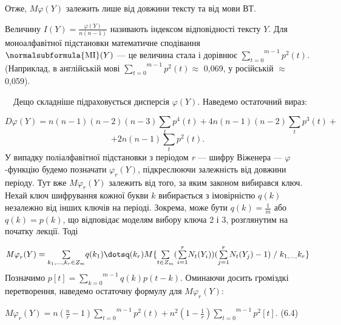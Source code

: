 Отже,  ${\mathit{M\varphi }(Y)}$ залежить лише від довжини тексту та від мови
ВТ.

 Величину  ${I(Y)=\frac{\varphi (Y)}{n(n-1)}}$ називають індексом відповідності
тексту  ${Y}$. Для моноалфавітної підстановки математичне сподівання  
${\normalsubformula{\text{MI}}(Y)}$ \textit{ }--- це величина стала і дорівнює 
${\overset{{m-1}}{\underset{{t=0}}{\sum }}{p^{{2}}(t)}}$. (Наприклад, в
англійській мові  ${\overset{{m-1}}{\underset{{t=0}}{\sum
}}{p^{{2}}(t)}}$${\approx}$ 0,069, у російській ${\approx}$ 0,059).

\ \ Дещо складніше підраховується дисперсія  ${\varphi (Y)}$. Наведемо
остаточний вираз:

\begin{equation*}
{\mathit{D\varphi }(Y)=n(n-1)(n-2)(n-3)\underset{{t}}{\sum
}{p^{{4}}(t)+4n(n-1)(n-2)\underset{{t}}{\sum }{p^{{3}}(t)+}}}
\end{equation*}
\begin{equation*}
{+2n(n-1)\underset{{t}}{\sum }{p^{{2}}(t)}\text{.}}
\end{equation*}
У випадку поліалфавітної підстановки з періодом \textit{r}\textit{ }--- шифру
Віженера ---  ${\varphi }${}-функцію будемо позначати  ${\varphi _{{r}}(Y)}$,
підкреслюючи залежність від довжини періоду. Тут вже  ${\mathit{M\varphi
}_{{r}}(Y)}$ залежить від того, за яким законом вибирався ключ. Нехай ключ
шифрування кожної букви  ${k}$ вибирається з імовірністю  ${q(k)}$ незалежно
від інших ключів на періоді. Зокрема, може бути  ${q(k)=\frac{1}{m}}$ або 
${q(k)=p(k)}$, що відповідає моделям вибору ключа 2 і 3, розглянутим на початку
лекції. Тоді 

\begin{equation*}
\begin{matrix}{\mathit{M\varphi
}_{{r}}(Y)=\underset{k_{{1}},\dots,k_{{r}}\in Z_{{m}}}{\sum
}{q(k_{{1}})\dotsq(k_{{r}})M\{\underset{{t\in Z_{{m}}}}{\sum
}{(\overset{{r}}{\underset{{i=1}}{\sum
}}{N_{{t}}(Y_{{i}}))(\overset{{r}}{\underset{{j=1}}{\sum
}}{N_{{t}}(Y_{{j}})-1)\;/\;k_{{1,\dots,}}k_{{r}}}}}\}}}\hfill\null
\end{matrix}\hfill 
\end{equation*}
Позначимо  ${p[t]=\overset{{m-1}}{\underset{{k=0}}{\sum }}{q(k)p(t-k)}}$.
Оминаючи досить громіздкі перетворення, наведемо остаточну формулу для 
${\mathit{M\varphi }_{{r}}(Y)}$:


\bigskip

{\raggedleft
  ${\mathit{M\varphi
}_{{r}}(Y)=n(\frac{n}{r}-1)\overset{{m-1}}{\underset{{t=0}}{\sum
}}{p^{{2}}(t)+n^{{2}}(1-\frac{1}{r})}\overset{{m-1}}{\underset{{t=0}}{\sum
}}{p^{{2}}[t]}}$.  (6.4)
\par}

